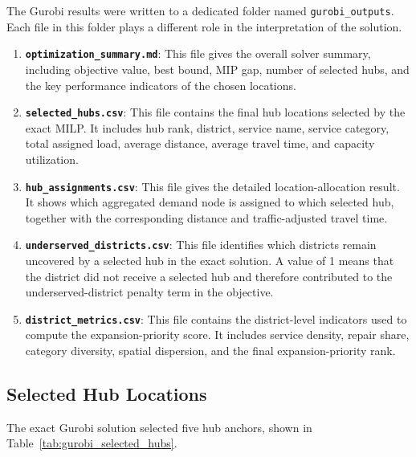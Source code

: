 The Gurobi results were written to a dedicated folder named \texttt{gurobi\_outputs}. Each file in this folder plays a different role in the interpretation of the solution.

\begin{enumerate}
    \item \textbf{\texttt{optimization\_summary.md}}: This file gives the overall solver summary, including objective value, best bound, MIP gap, number of selected hubs, and the key performance indicators of the chosen locations.
    \item \textbf{\texttt{selected\_hubs.csv}}: This file contains the final hub locations selected by the exact MILP. It includes hub rank, district, service name, service category, total assigned load, average distance, average travel time, and capacity utilization.
    \item \textbf{\texttt{hub\_assignments.csv}}: This file gives the detailed location-allocation result. It shows which aggregated demand node is assigned to which selected hub, together with the corresponding distance and traffic-adjusted travel time.
    \item \textbf{\texttt{underserved\_districts.csv}}: This file identifies which districts remain uncovered by a selected hub in the exact solution. A value of 1 means that the district did not receive a selected hub and therefore contributed to the underserved-district penalty term in the objective.
    \item \textbf{\texttt{district\_metrics.csv}}: This file contains the district-level indicators used to compute the expansion-priority score. It includes service density, repair share, category diversity, spatial dispersion, and the final expansion-priority rank.
\end{enumerate}

\subsection{Selected Hub Locations}

The exact Gurobi solution selected five hub anchors, shown in Table~\ref{tab:gurobi_selected_hubs}.

